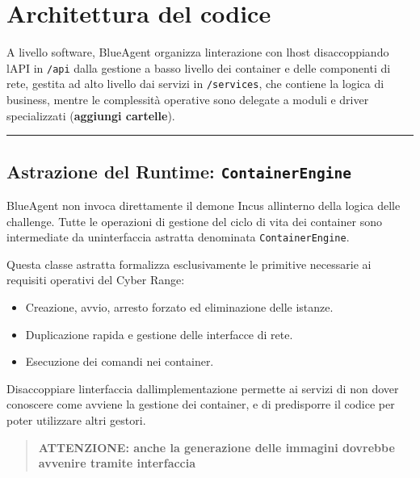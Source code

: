\section{Architettura del codice}\label{architettura-del-codice}

A livello software, BlueAgent organizza l\textquotesingle interazione
con l\textquotesingle host disaccoppiando l\textquotesingle API in
\passthrough{\lstinline!/api!} dalla gestione a basso livello dei
container e delle componenti di rete, gestita ad alto livello dai
servizi in \passthrough{\lstinline!/services!}, che contiene la logica
di business, mentre le complessità operative sono delegate a moduli e
driver specializzati (\textbf{aggiungi cartelle}).

\begin{center}\rule{0.5\linewidth}{0.5pt}\end{center}

\subsection{\texorpdfstring{Astrazione del Runtime:
\texttt{ContainerEngine}}{Astrazione del Runtime: ContainerEngine}}\label{astrazione-del-runtime-containerengine}

BlueAgent non invoca direttamente il demone Incus
all\textquotesingle interno della logica delle challenge. Tutte le
operazioni di gestione del ciclo di vita dei container sono intermediate
da un\textquotesingle interfaccia astratta denominata
\passthrough{\lstinline!ContainerEngine!}.

Questa classe astratta formalizza esclusivamente le primitive necessarie
ai requisiti operativi del Cyber Range:

\begin{itemize}
\tightlist
\item
  Creazione, avvio, arresto forzato ed eliminazione delle istanze.
\item
  Duplicazione rapida e gestione delle interfacce di rete.
\item
  Esecuzione dei comandi nei container.
\end{itemize}

Disaccoppiare l\textquotesingle interfaccia
dall\textquotesingle implementazione permette ai servizi di non dover
conoscere come avviene la gestione dei container, e di predisporre il
codice per poter utilizzare altri gestori.

\begin{quote}
\textbf{ATTENZIONE: anche la generazione delle immagini dovrebbe
avvenire tramite interfaccia}
\end{quote}


